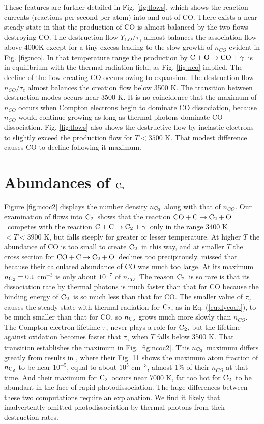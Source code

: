 \documentclass[manuscript]{aastex}
\newcommand{\ctwo}{{\rm C}_2}
\newcommand{\cenn}{{\rm C}_n}
\newcommand{\cotoco}{${\rm C} + {\rm O} \to {\rm CO} + \gamma$}
\newcommand{\twoctoctwo}{${\rm C} + {\rm C} \to \ctwo + \gamma$}
\newcommand{\coctoctwo}{${\rm CO} + {\rm C} \to \ctwo + {\rm O}$}
\begin{document}
These features are further detailed in Fig. \ref{fig:flows},
which shows the reaction
currents (reactions per second per atom) into and out of CO. There exists a
near steady state in that the production of CO is almost balanced by the
two flows destroying CO. The destruction flow $Y_{CO}/\tau_\gamma$
almost balances the
association flow above 4000K except for a tiny excess leading to the
slow growth of $n_{CO}$ evident in Fig. \ref{fig:nco}. In that temperature 
range the
production by \cotoco\ is in equilibrium with the thermal radiation field,
as Fig. \ref{fig:nco} implied. The decline of the flow creating CO occurs owing
to expansion. The destruction flow $n_{CO}/\tau_e$ almost balances the
creation flow below 3500 K. The transition between destruction modes occurs
near 3500 K. It is no coincidence that the maximum of $n_{CO}$ occurs when
Compton electrons begin to dominate CO dissociation, because $n_{CO}$ would
continue growing as long as thermal photons dominate CO dissociation. 
Fig. \ref{fig:flows} also shows the destructive flow by inelastic electrons
to slightly exceed the production flow for $T < 3500$ K. That modest difference
causes CO to decline following it maximum. 

\section{Abundances of $\cenn$}

Figure \ref{fig:ncoc2} displays the number density $n_{\ctwo}$ along with
that of $n_{CO}$.
Our examination of flows into $\ctwo$\ shows that the reaction
\coctoctwo\ competes with the reaction \twoctoctwo\ only in the
range 3400 K $< T < 3900$ K, but falls steeply for greater or lesser
temperature.  At higher $T$ the abundance of CO is too small to create
$\ctwo$\ in this way, and at smaller $T$ the cross section for \coctoctwo\
declines too precipitously.  \citet{2009ApJ...703..642C} missed that
because their calculated abundance of CO was much too large.
At its maximum $n_{\ctwo} =0.1$ cm$^{-3}$ is only about
$10^{-7}$ of $n_{CO}$. The reason $\ctwo$\ is so rare is that its dissociation
rate by thermal photons is much faster than that for CO because the binding
energy of $\ctwo$\ is
so much less than that for CO.
The smaller value of $\tau_\gamma$ causes the steady state with thermal
radiation for $\ctwo$, as in Eq. (\ref{eq:dycodt}), to be much smaller than 
that for CO, so $n_{\ctwo}$ grows much more slowly than $n_{CO}$.  The Compton
electron lifetime $\tau_e$ never plays a role for $\ctwo$, but the
lifetime against oxidation becomes faster that $\tau_\gamma$ when $T$
falls below 3500 K.  That transition establishes the maximum in
Fig. \ref{fig:ncoc2}.
This $n_{\ctwo}$
maximum differs greatly
from results in \citet{2009ApJ...703..642C}, where their Fig. 11 shows the
maximum atom fraction of $n_{\ctwo}$ to be near $10^{-5}$,
equal to about $10^5$ cm$^{-3}$, almost 1\% of their $n_{CO}$ at that time.
And their maximum for $\ctwo$\ occurs near 7000 K, far too hot for $\ctwo$\ to
be abundant in the face of rapid photodissociation. The huge differences between
these two computations require an explanation. We find it likely that
\cite{2009ApJ...703..642C} inadvertently omitted photodissociation by thermal
photons from their destruction rates.  
\end{document}
